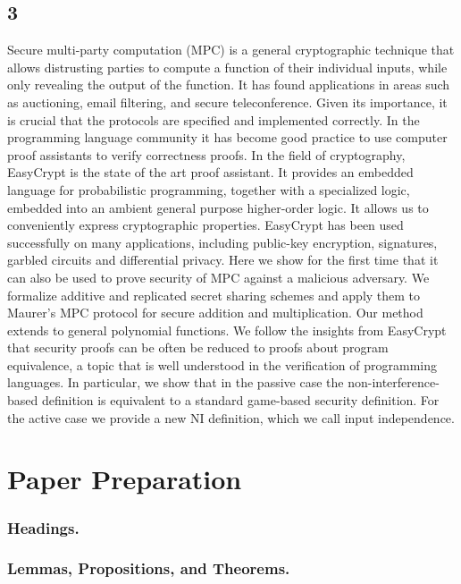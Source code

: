 \documentclass[runningheads,a4paper]{llncs}
\begin{document}
\subsection{3}
Secure multi-party computation (MPC) is a general cryptographic technique that allows distrusting parties to compute a function of their individual inputs, while only revealing the output of the function. It has found applications in areas such as auctioning, email filtering, and secure teleconference. Given its importance, it is crucial that the protocols are specified and implemented correctly. In the programming language community it has become good practice to use computer proof assistants to verify correctness proofs. In the field of cryptography, EasyCrypt is the state of the art proof assistant. It provides an embedded language for probabilistic programming, together with a specialized logic, embedded into an ambient general purpose higher-order logic. It allows us to conveniently express cryptographic properties. EasyCrypt has been used successfully on many applications, including public-key encryption, signatures, garbled circuits and differential privacy. Here we show for the first time that it can also be used to prove security of MPC against a malicious adversary. We formalize additive and replicated secret sharing schemes and apply them to Maurer's MPC protocol for secure addition and multiplication. Our method extends to general polynomial functions. We follow the insights from EasyCrypt that security proofs can be often be reduced to proofs about program equivalence, a topic that is well understood in the verification of programming languages. In particular, we show that in the passive case the non-interference-based definition is equivalent to a standard game-based security definition. For the active case we provide a new NI definition, which we call input independence.

\section{Paper Preparation}



\subsubsection{Headings.}



\subsubsection{Lemmas, Propositions, and Theorems.}
\end{document}
